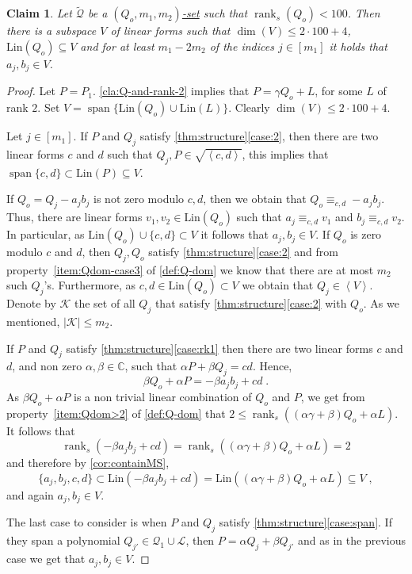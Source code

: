\documentclass[10pt,a4paper]{article}
\newtheorem{claim}[theorem]{Claim}
\def\rank{\operatorname{rank}}
\renewcommand{\C}{\mathbb{C}}
\newcommand{\cK}{{\mathcal{K}}}
\newcommand{\calL}{{\mathcal{L}}}
\newcommand{\cQ}{{\mathcal{Q}}}
\newcommand{\ideal}[1]{\left \langle{#1}\right \rangle}
\newcommand{\spn}[1]{\operatorname{span}\{{#1}\}}
\newcommand{\rkq}{100}
\newcommand{\MS}{\text{Lin}}
\begin{document}
\begin{claim}\label{cla:m-2k-in-ideal-v}
Let $\tilde{\cQ}$ be a \hyperref[def:Q-dom]{$(Q_o,m_1,m_2)$-set} such that $\rank_s(Q_o)< \rkq$. 
Then there is a subspace $V$ of linear  forms such that $\dim(V) \leq 2\cdot \rkq+4$, $\MS(Q_o)\subseteq V$ and for at least $m_1-2m_2 $ of the indices $j\in[m_1]$ it holds that $a_j,b_j \in V$.
\end{claim}
\begin{proof}
Let $P=P_1$.
\autoref{cla:Q-and-rank-2} implies that $P = \gamma Q_o+L$, for some $L$ of rank $2$. Set $V = \spn{\MS(Q_o)\cup\MS(L)}$. Clearly $\dim(V)\leq 2 \cdot \rkq+4$.

Let $j\in [m_1]$. 
If $P$ and $Q_j$ satisfy \autoref{thm:structure}\ref{case:2}, then there are two linear forms $c$ and $d$ such that  $Q_j,P\in \sqrt{\ideal{c,d}}$, this implies that $\spn{c,d} \subset\MS(P) \subseteq V$. 

If $Q_o=Q_j-a_j b_j$ is not zero modulo ${c,d}$, then we obtain that $Q_o\equiv_{c,d} -a_j b_j$. Thus, there are linear forms $v_1,v_2\in\MS(Q_o)$ such that $a_j \equiv_{c,d} v_1$ and $b_j \equiv_{c,d} v_2$. In particular, as $\MS(Q_o)\cup\{c,d\}\subset V$ it follows that $a_j,b_j\in V$.
If $Q_o$ is zero modulo $c$ and $d$, then $Q_{j},Q_o$ satisfy \autoref{thm:structure}\ref{case:2} and from property~\ref{item:Qdom-case3} of \autoref{def:Q-dom} we know that there are at most $m_2$ such $Q_j$'s. Furthermore, as  $c,d\in\MS(Q_o) \subset V$ we obtain that $Q_j \in \ideal{V}$. Denote by $\cK$ the set of all $Q_j$ that satisfy \autoref{thm:structure}\ref{case:2} with $Q_o$. As we mentioned, $|\cK|\leq m_2$.

If $P$ and $Q_j$ satisfy  \autoref{thm:structure}\ref{case:rk1} then there are two linear forms $c$ and $d$, and non zero $\alpha, \beta \in \C$, such that $\alpha P + \beta Q_j = cd$. Hence,
\begin{equation*}
\beta Q_o+\alpha P=  - \beta a_jb_j +cd\;.
\end{equation*}
As $\beta Q_o+\alpha P$ is a non trivial linear combination of $Q_o$ and $P$, we get from property~\ref{item:Qdom>2} of \autoref{def:Q-dom} that $2 \leq \rank_s((\alpha\gamma+\beta)Q_o+\alpha L)$. It follows that $$\rank_s(- \beta a_jb_j +cd)=\rank_s((\alpha\gamma+\beta)Q_o+\alpha L)= 2$$ and therefore by \autoref{cor:containMS}, $$\{a_j,b_j,c,d\}\subset \MS(-\beta a_jb_j +cd)= \MS((\alpha\gamma+\beta)Q_o+\alpha L)\subseteq V\;,$$ and again $a_j,b_j\in V$.

The last case to consider is when $P$ and $Q_j$ satisfy  \autoref{thm:structure}\ref{case:span}. If they span a polynomial $Q_{j'} \in \cQ_1\cup \calL$,   then $P = \alpha Q_j + \beta Q_{j'}$ and as in the previous case we get that $ a_{j}, b_{j} \in V$.


\end{proof}
\end{document}
